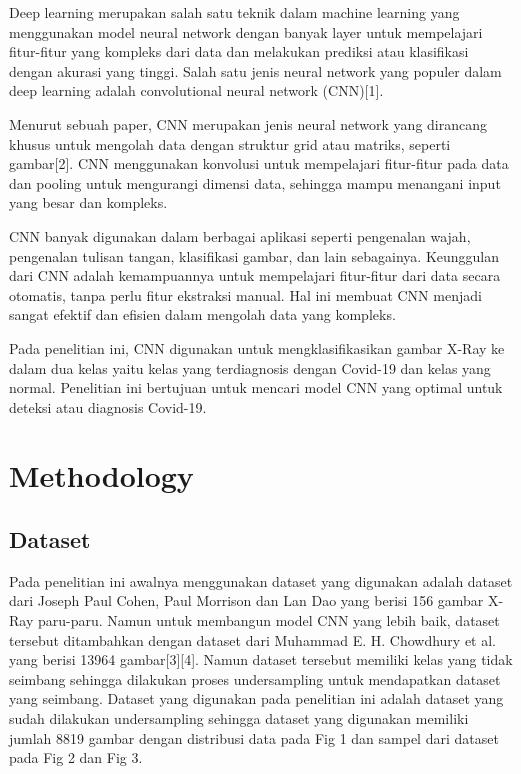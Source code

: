 \documentclass[conference]{IEEEtran}
\begin{document}
Deep learning merupakan salah satu teknik dalam machine learning yang menggunakan model neural network dengan banyak layer untuk mempelajari fitur-fitur yang kompleks dari data dan melakukan prediksi atau klasifikasi dengan akurasi yang tinggi. Salah satu jenis neural network yang populer dalam deep learning adalah convolutional neural network (CNN)[1].

Menurut sebuah paper, CNN merupakan jenis neural network yang dirancang khusus untuk mengolah data dengan struktur grid atau matriks, seperti gambar[2]. CNN menggunakan konvolusi untuk mempelajari fitur-fitur pada data dan pooling untuk mengurangi dimensi data, sehingga mampu menangani input yang besar dan kompleks.

CNN banyak digunakan dalam berbagai aplikasi seperti pengenalan wajah, pengenalan tulisan tangan, klasifikasi gambar, dan lain sebagainya. Keunggulan dari CNN adalah kemampuannya untuk mempelajari fitur-fitur dari data secara otomatis, tanpa perlu fitur ekstraksi manual. Hal ini membuat CNN menjadi sangat efektif dan efisien dalam mengolah data yang kompleks.

Pada penelitian ini, CNN digunakan untuk mengklasifikasikan gambar X-Ray ke dalam dua kelas yaitu kelas yang terdiagnosis dengan Covid-19 dan kelas yang normal. Penelitian ini bertujuan untuk mencari model CNN yang optimal untuk deteksi atau diagnosis Covid-19.

\section{Methodology}

\subsection{Dataset}
Pada penelitian ini awalnya menggunakan dataset yang digunakan adalah dataset dari Joseph Paul Cohen, Paul Morrison dan Lan Dao yang berisi 156 gambar X-Ray paru-paru. Namun untuk membangun model CNN yang lebih baik, dataset tersebut ditambahkan dengan dataset dari Muhammad E. H. Chowdhury et al. yang berisi 13964 gambar[3][4]. Namun dataset tersebut memiliki kelas yang tidak seimbang sehingga dilakukan proses undersampling untuk mendapatkan dataset yang seimbang. Dataset yang digunakan pada penelitian ini adalah dataset yang sudah dilakukan undersampling sehingga dataset yang digunakan memiliki jumlah 8819 gambar dengan distribusi data pada Fig 1 dan sampel dari dataset pada Fig 2 dan Fig 3.
\end{document}

